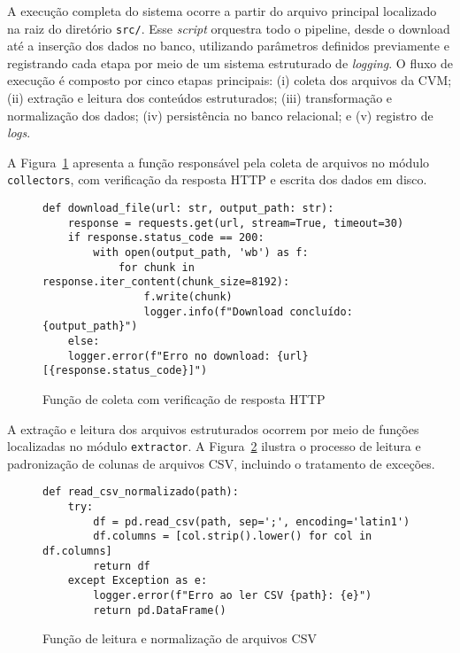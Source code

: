 A execução completa do sistema ocorre a partir do arquivo principal localizado na raiz do diretório \texttt{src/}. Esse \textit{script} orquestra todo o pipeline, desde o download até a inserção dos dados no banco, utilizando parâmetros definidos previamente e registrando cada etapa por meio de um sistema estruturado de \textit{logging}. O fluxo de execução é composto por cinco etapas principais: (i) coleta dos arquivos da CVM; (ii) extração e leitura dos conteúdos estruturados; (iii) transformação e normalização dos dados; (iv) persistência no banco relacional; e (v) registro de \textit{logs}.

A Figura~\ref{fig:codigo_download} apresenta a função responsável pela coleta de arquivos no módulo \texttt{collectors}, com verificação da resposta HTTP e escrita dos dados em disco.

\begin{figure}[!htb]
	\centering
	\caption{Função de coleta com verificação de resposta HTTP}
	\label{fig:codigo_download}
	\begin{varwidth}{\linewidth}
		\begin{verbatim}
def download_file(url: str, output_path: str):
	response = requests.get(url, stream=True, timeout=30)
	if response.status_code == 200:
		with open(output_path, 'wb') as f:
			for chunk in response.iter_content(chunk_size=8192):
				f.write(chunk)
				logger.info(f"Download concluído: {output_path}")
	else:
	logger.error(f"Erro no download: {url} [{response.status_code}]")
		\end{verbatim}
	\end{varwidth}
\end{figure}

A extração e leitura dos arquivos estruturados ocorrem por meio de funções localizadas no módulo \texttt{extractor}. A Figura~\ref{fig:codigo_read_csv} ilustra o processo de leitura e padronização de colunas de arquivos CSV, incluindo o tratamento de exceções.

\begin{figure}[!htb]
	\centering
	\caption{Função de leitura e normalização de arquivos CSV}
	\label{fig:codigo_read_csv}
	\begin{varwidth}{\linewidth}
		\begin{verbatim}
def read_csv_normalizado(path):
	try:
		df = pd.read_csv(path, sep=';', encoding='latin1')
		df.columns = [col.strip().lower() for col in df.columns]
		return df
	except Exception as e:
		logger.error(f"Erro ao ler CSV {path}: {e}")
		return pd.DataFrame()
		\end{verbatim}
	\end{varwidth}
\end{figure}

